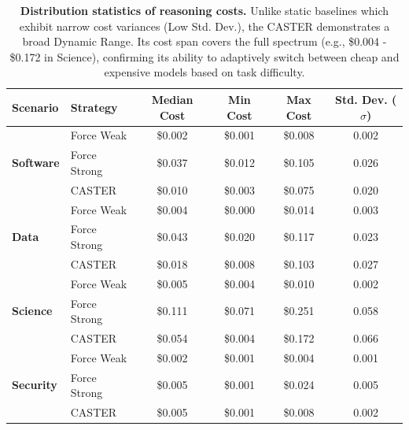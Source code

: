 \documentclass{article}
\theoremstyle{plain}
\theoremstyle{definition}
\theoremstyle{remark}
\begin{document}
\begin{table}[t]
    \centering
    \caption{\textbf{Distribution statistics of reasoning costs.} Unlike static baselines which exhibit narrow cost variances (Low Std. Dev.), the CASTER demonstrates a broad Dynamic Range. Its cost span covers the full spectrum (e.g., \$0.004 - \$0.172 in Science), confirming its ability to adaptively switch between cheap and expensive models based on task difficulty.}
    \label{tab:cost_distribution}
    \begin{tabular}{llcccc}
        \toprule
        \textbf{Scenario} & \textbf{Strategy} & \textbf{Median Cost} & \textbf{Min Cost} & \textbf{Max Cost} & \textbf{Std. Dev. ($\sigma$)} \\
        \midrule
        \multirow{3}{*}{\textbf{Software}} 
        & Force Weak   & \$0.002 & \$0.001 & \$0.008 & 0.002 \\
        & Force Strong & \$0.037 & \$0.012 & \$0.105 & 0.026 \\
        & CASTER& \$0.010& \$0.003& \$0.075& 0.020\\ 
        \midrule
        \multirow{3}{*}{\textbf{Data}} 
        & Force Weak   & \$0.004 & \$0.000 & \$0.014 & 0.003 \\
        & Force Strong & \$0.043 & \$0.020 & \$0.117 & 0.023 \\
        & CASTER& \$0.018& \$0.008& \$0.103& 0.027\\ 
        \midrule
        \multirow{3}{*}{\textbf{Science}} 
        & Force Weak   & \$0.005 & \$0.004 & \$0.010 & 0.002 \\
        & Force Strong & \$0.111 & \$0.071 & \$0.251 & 0.058 \\
        & CASTER& \$0.054& \$0.004& \$0.172& 0.066\\ %
        \midrule
        \multirow{3}{*}{\textbf{Security}} 
        & Force Weak   & \$0.002 & \$0.001 & \$0.004 & 0.001 \\
        & Force Strong & \$0.005 & \$0.001 & \$0.024 & 0.005 \\
        & CASTER& \$0.005& \$0.001& \$0.008& 0.002\\ 
        \bottomrule
    \end{tabular}
\end{table}
\end{document}
